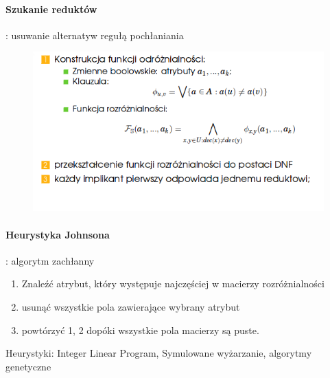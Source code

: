 \documentclass[10pt,a4paper]{article}
\begin{document}
  \paragraph{Szukanie reduktów} : usuwanie alternatyw regułą pochłaniania
  \begin{figure}[H]
    \centering
      \includegraphics[scale=0.50]{images/redukt.png}
  \end{figure}
  \paragraph{Heurystyka Johnsona} : algorytm zachłanny
  \begin{enumerate}
      \item Znaleźć atrybut, który występuje najczęściej w macierzy rozróżnialności
      \item usunąć wszystkie pola zawierające wybrany atrybut
      \item powtórzyć 1, 2 dopóki wszystkie pola macierzy są puste.
  \end{enumerate}
  Heurystyki: Integer Linear Program, Symulowane wyżarzanie, algorytmy genetyczne
\end{document}
